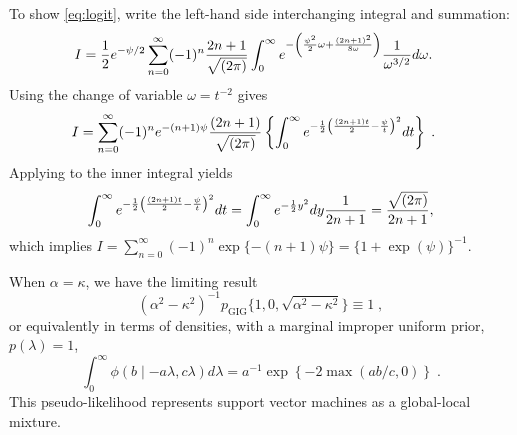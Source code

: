 \documentclass[lineno]{biometrika}
\begin{document}
To show \eqref{eq:logit}, write the left-hand side interchanging integral and summation:
\begin{align*}
I & = \frac{1}{2} e^{-\psi/2}  \sum_{n=0}^{\infty} (-1)^n \frac{2n+1}{\sqrt{(2\pi)}} \int_0^{\infty} e^{- \left( \frac{\psi^2}{2}  \omega + \frac{(2n+1)^2}{8\omega} \right) } \frac{1}{\omega^{3/2}} d\omega. 
\end{align*}
Using the change of variable $\omega = t^{-2}$ gives
\begin{align*}
  I & = \sum_{n=0}^{\infty} (-1)^n e^{-(n+1)\psi} 
  \frac{(2n+1)}{\sqrt{(2\pi)}} 
  \left\{ \int_{0}^{\infty} 
  e^{-\frac{1}{2} \left( \frac{(2n+1)t}{2} - \frac{\psi}{t}\right)^2 } dt 
  \right\}
  \;.
\end{align*}
Applying \CS{} to the inner integral yields 
$$ 
\int_{0}^{\infty} e^{-\frac{1}{2} \left( \frac{(2n+1)t}{2} - \frac{\psi}{t}\right)^2 } dt 
= \int_0^{\infty} e^{-\frac{1}{2} y^2} dy \frac{1}{2n+1} 
\\
= \frac{\sqrt{(2\pi)}}{2n+1},
$$
which implies 
$I = \sum_{n=0}^{\infty} (-1)^n \exp\{-(n+1)\psi\} = \{1+\exp(\psi)\}^{-1}$. 

\begin{remark}
When $\alpha = \kappa$, we have the limiting result 
$$
(\alpha^2-\kappa^2)^{-1} p_{\mathrm{GIG}}\{1,0, \sqrt{\alpha^2-\kappa^2} \} 
\equiv 1
\;,
$$
or equivalently in terms of densities, with a marginal improper uniform prior, 
$p(\lambda) = 1$,
\begin{equation}
  \int_{0}^{\infty} \phi(b \mid -a\lambda, c\lambda) d\lambda 
  = a^{-1} \exp\left\{-2 \max(ab/c,0)\right\}
  \;. 
  \label{eq:svm}
\end{equation}
This pseudo-likelihood represents support vector machines as a global-local mixture. 
\end{remark}
\end{document}
